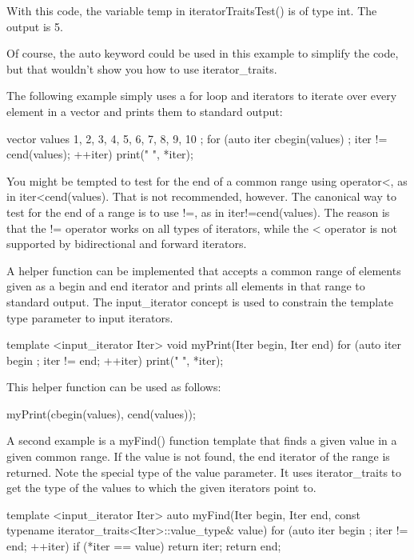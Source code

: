 With this code, the variable temp in iteratorTraitsTest() is of type int. The output is 5.

Of course, the auto keyword could be used in this example to simplify the code, but that wouldn’t show you how to use iterator\_traits.


The following example simply uses a for loop and iterators to iterate over every element in a vector and prints them to standard output:

\begin{cpp}
vector values { 1, 2, 3, 4, 5, 6, 7, 8, 9, 10 };
for (auto iter { cbegin(values) }; iter != cend(values); ++iter) {
    print("{} ", *iter);
}
\end{cpp}

You might be tempted to test for the end of a common range using operator<, as in iter<cend(values). That is not recommended, however. The canonical way to test for the end of a range is to use !=, as in iter!=cend(values). The reason is that the != operator works on all types of iterators, while the < operator is not supported by bidirectional and forward iterators.

A helper function can be implemented that accepts a common range of elements given as a begin and end iterator and prints all elements in that range to standard output. The input\_iterator concept is used to constrain the template type parameter to input iterators.

\begin{cpp}
template <input_iterator Iter>
void myPrint(Iter begin, Iter end)
{
    for (auto iter { begin }; iter != end; ++iter) { print("{} ", *iter); }
}
\end{cpp}

This helper function can be used as follows:

\begin{cpp}
myPrint(cbegin(values), cend(values));
\end{cpp}

A second example is a myFind() function template that finds a given value in a given common range. If the value is not found, the end iterator of the range is returned. Note the special type of the value parameter. It uses iterator\_traits to get the type of the values to which the given iterators point to.

\begin{cpp}
template <input_iterator Iter>
auto myFind(Iter begin, Iter end,
    const typename iterator_traits<Iter>::value_type& value)
{
    for (auto iter { begin }; iter != end; ++iter) {
        if (*iter == value) { return iter; }
    }
    return end;
}
\end{cpp}

